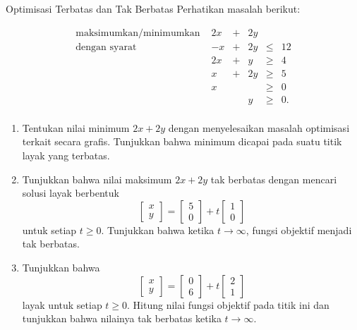 \begin{ex}{Optimisasi Terbatas dan Tak Berbatas}{}
Perhatikan masalah berikut:

\[
\begin{array}{rrcllll}
\text{maksimumkan/minimumkan } & 2x & + & 2y \\
\text{dengan syarat} & -x & + & 2y & \leq & 12 \\
& 2x & + & y & \geq & 4 \\
& x & + & 2y & \geq & 5 \\
& x & & & \geq & 0 \\
& & & y & \geq & 0. \\
\end{array}
\]

\begin{enumerate}

\item Tentukan nilai minimum \(2x + 2y\) dengan menyelesaikan masalah optimisasi terkait secara grafis. Tunjukkan bahwa minimum dicapai pada suatu titik layak yang terbatas.

\item Tunjukkan bahwa nilai maksimum \(2x + 2y\) tak berbatas dengan mencari solusi layak berbentuk
\[
\begin{bmatrix} x \\ y \end{bmatrix} = \begin{bmatrix} 5\\ 0\end{bmatrix} + t \begin{bmatrix} 1\\ 0\end{bmatrix}
\]
untuk setiap \(t \geq 0\). Tunjukkan bahwa ketika \(t \to \infty\), fungsi objektif menjadi tak berbatas.

\item Tunjukkan bahwa
\[
\begin{bmatrix} x \\ y \end{bmatrix} = \begin{bmatrix} 0 \\ 6 \end{bmatrix} + t\begin{bmatrix} 2 \\ 1 \end{bmatrix}
\]
layak untuk setiap \(t \geq 0\). Hitung nilai fungsi objektif pada titik ini dan tunjukkan bahwa nilainya tak berbatas ketika \(t \to \infty\).

\end{enumerate}
\exrefs{\S\ref{sec:unbounded-regions}}
\end{ex}

